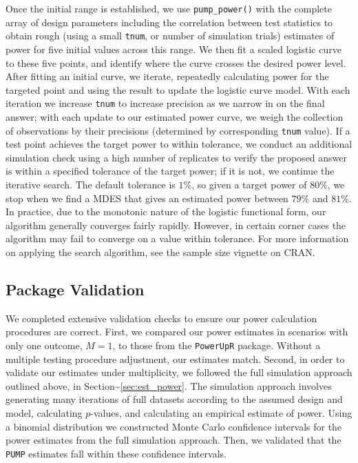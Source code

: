 \documentclass[
]{article}
\begin{document}
Once the initial range is established, we use \texttt{pump\_power()}
with the complete array of design parameters including the correlation
between test statistics to obtain rough (using a small \texttt{tnum}, or
number of simulation trials) estimates of power for five initial values
across this range. We then fit a scaled logistic curve to these five
points, and identify where the curve crosses the desired power level.
After fitting an initial curve, we iterate, repeatedly calculating power
for the targeted point and using the result to update the logistic curve
model. With each iteration we increase \texttt{tnum} to increase
precision as we narrow in on the final answer; with each update to our
estimated power curve, we weigh the collection of observations by their
precisions (determined by corresponding \texttt{tnum} value). If a test
point achieves the target power to within tolerance, we conduct an
additional simulation check using a high number of replicates to verify
the proposed answer is within a specified tolerance of the target power;
if it is not, we continue the iterative search. The default tolerance is
\(1\%\), so given a target power of \(80\%\), we stop when we find a
MDES that gives an estimated power between \(79\%\) and \(81\%\). In
practice, due to the monotonic nature of the logistic functional form,
our algorithm generally converges fairly rapidly. However, in certain
corner cases the algorithm may fail to converge on a value within
tolerance. For more information on applying the search algorithm, see
the sample size vignette on CRAN.

\subsection{Package Validation}

We completed extensive validation checks to ensure our power calculation
procedures are correct. First, we compared our power estimates in
scenarios with only one outcome, \(M = 1\), to those from the
\texttt{PowerUpR} package. Without a multiple testing procedure
adjustment, our estimates match. Second, in order to validate our
estimates under multiplicity, we followed the full simulation approach
outlined above, in Section\textasciitilde{}\ref{sec:est_power}. The
simulation approach involves generating many iterations of full datasets
according to the assumed design and model, calculating \(p\)-values, and
calculating an empirical estimate of power. Using a binomial
distribution we constructed Monte Carlo confidence intervals for the
power estimates from the full simulation approach. Then, we validated
that the \texttt{PUMP} estimates fall within these confidence intervals.
\end{document}
